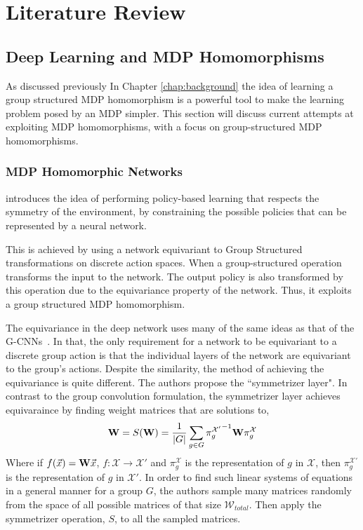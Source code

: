 \chapter{Literature Review}\label{chap:litreview}

\section{Deep Learning and MDP Homomorphisms}
As discussed previously In Chapter \ref{chap:background} the idea of learning a group structured MDP homomorphism is a powerful tool to make the learning problem posed by an MDP simpler. This section will discuss current attempts at exploiting MDP homomorphisms, with a focus on group-structured MDP homomorphisms.
\subsection{MDP Homomorphic Networks}\label{sec:symmetrizer}
\cite{vanderpol2020mdp} introduces the idea of performing policy-based learning that respects the symmetry of the environment, by constraining the possible policies that can be represented by a neural network.

This is achieved by using a network equivariant to Group Structured transformations on discrete action spaces. When a group-structured operation transforms the input to the network. The output policy is also transformed by this operation due to the equivariance property of the network. Thus, it exploits a group structured MDP homomorphism.

The equivariance in the deep network uses many of the same ideas as that of the G-CNNs~\cite{cohen2016group}. In that, the only requirement for a network to be equivariant to a discrete group action is that the individual layers of the network are equivariant to the group's actions. Despite the similarity, the \cite{vanderpol2020mdp} method of achieving the equivariance is quite different. The authors propose the ``symmetrizer layer". In contrast to the group convolution formulation, the symmetrizer layer achieves equivaraince by finding weight matrices that are solutions to,
\begin{equation}
	\label{eqn:symmetrizer}
	\mathbf{W} =S(\mathbf{W}) = \frac{1}{|G|}\sum_{g\in G}{\pi_g^{\mathcal{X}'}}^{-1}\mathbf{W}\pi_g^{\mathcal{X}}
\end{equation}
Where if $f(\vec{x}) = \mathbf{W}\vec{x}$, $f: \mathcal{X} \rightarrow {\mathcal{X}'}$ and $\pi_g^{\mathcal{X}}$ is the representation of $g$ in $\mathcal{X}$, then $\pi_g^{\mathcal{X}'}$ is the representation of $g$ in $\mathcal{X}'$. In order to find such linear systems of equations in a general manner for a group $G$, the authors sample many matrices randomly from the space of all possible matrices of that size $\mathcal{W}_{total}$. Then apply the symmetrizer operation, $S$, to all the sampled matrices.



